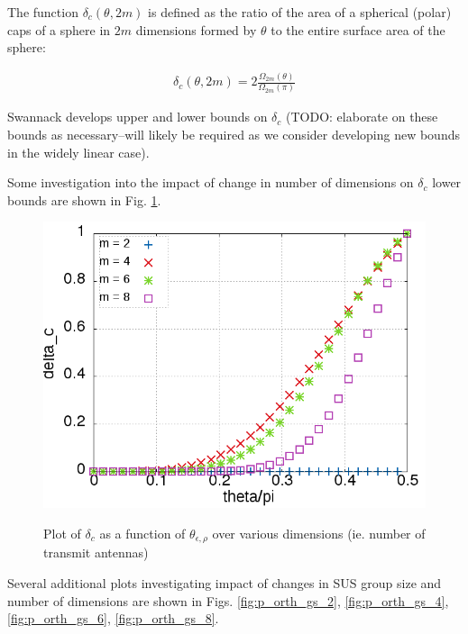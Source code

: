 The function $\delta_c(\theta,2m)$ is defined as the ratio of the area of a spherical (polar) caps of a sphere in $2m$ dimensions formed by $\theta$ to the entire surface area of the sphere:

\begin{equation}\label{eq:delta_c_sphere}
    \begin{aligned}
        \delta_c(\theta,2m) = 2\frac{\Omega_{2m}(\theta)}{\Omega_{2m}(\pi)}
    \end{aligned}
\end{equation}

Swannack develops upper and lower bounds on $\delta_c$ (TODO: elaborate on these bounds as necessary--will likely be required as we consider developing new bounds in the widely linear case).

Some investigation into the impact of change in number of dimensions on $\delta_c$ lower bounds are shown in Fig. \ref{fig:delta}.
\begin{figure}
    \includegraphics[width=12cm]{figs/delta.png}\\
    \caption{Plot of $\delta_c$ as a function of $\theta_{\epsilon,\rho}$ over various dimensions (ie. number of transmit antennas)}
    \label{fig:delta}
\end{figure}

Several additional plots investigating impact of changes in SUS group size and number of dimensions are shown in Figs. \ref{fig:p_orth_gs_2}, \ref{fig:p_orth_gs_4}, \ref{fig:p_orth_gs_6}, \ref{fig:p_orth_gs_8}.

